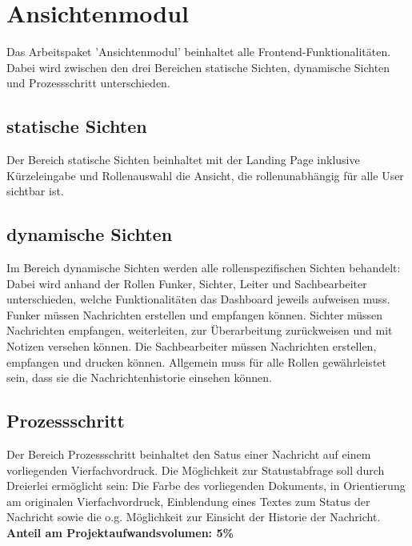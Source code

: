 \section{Ansichtenmodul} 
Das Arbeitspaket 'Ansichtenmodul' beinhaltet alle Frontend-Funktionalitäten. 
Dabei wird zwischen den drei Bereichen statische Sichten, dynamische Sichten 
und Prozessschritt unterschieden. 
\subsection{statische Sichten}
Der Bereich statische Sichten beinhaltet mit der Landing Page inklusive 
Kürzeleingabe und Rollenauswahl die Ansicht, die rollenunabhängig für alle User sichtbar ist.
\subsection{dynamische Sichten}
Im Bereich dynamische Sichten werden alle rollenspezifischen Sichten 
behandelt: Dabei wird anhand der Rollen Funker, Sichter, Leiter und 
Sachbearbeiter unterschieden, welche Funktionalitäten das Dashboard jeweils 
aufweisen muss. Funker müssen Nachrichten erstellen und empfangen können.
Sichter müssen Nachrichten empfangen, weiterleiten, zur Überarbeitung 
zurückweisen und mit Notizen versehen können. Die Sachbearbeiter müssen 
Nachrichten erstellen, empfangen und drucken können. 
Allgemein muss für alle Rollen gewährleistet sein, dass sie die 
Nachrichtenhistorie einsehen können.
\subsection{Prozessschritt} 
Der Bereich Prozessschritt beinhaltet den Satus einer Nachricht 
auf einem vorliegenden Vierfachvordruck. Die Möglichkeit zur Statustabfrage 
soll durch Dreierlei ermöglicht sein: Die Farbe des vorliegenden Dokuments, 
in Orientierung am originalen Vierfachvordruck, Einblendung eines 
Textes zum Status der Nachricht sowie die o.g. Möglichkeit zur Einsicht der 
Historie der Nachricht.
\textbf{Anteil am Projektaufwandsvolumen: 5\%}